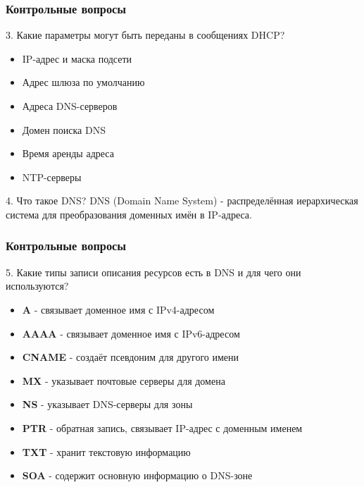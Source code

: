 \begin{frame}
\frametitle{Контрольные вопросы}
\begin{block}{3. Какие параметры могут быть переданы в сообщениях DHCP?}
\begin{itemize}
    \item IP-адрес и маска подсети
    \item Адрес шлюза по умолчанию
    \item Адреса DNS-серверов
    \item Домен поиска DNS
    \item Время аренды адреса
    \item NTP-серверы
\end{itemize}
\end{block}
\begin{block}{4. Что такое DNS?}
DNS (Domain Name System) - распределённая иерархическая система для преобразования доменных имён в IP-адреса.
\end{block}
\end{frame}

\begin{frame}
\frametitle{Контрольные вопросы}
\begin{block}{5. Какие типы записи описания ресурсов есть в DNS и для чего они используются?}
\begin{itemize}
    \item \textbf{A} - связывает доменное имя с IPv4-адресом
    \item \textbf{AAAA} - связывает доменное имя с IPv6-адресом
    \item \textbf{CNAME} - создаёт псевдоним для другого имени
    \item \textbf{MX} - указывает почтовые серверы для домена
    \item \textbf{NS} - указывает DNS-серверы для зоны
    \item \textbf{PTR} - обратная запись, связывает IP-адрес с доменным именем
    \item \textbf{TXT} - хранит текстовую информацию
    \item \textbf{SOA} - содержит основную информацию о DNS-зоне
\end{itemize}
\end{block}
\end{frame}

